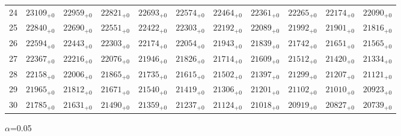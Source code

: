 \documentclass[10pt, a4paper]{article}
\begin{document}
\begin{center}
\begin{tabular}{c || c c c c c | c c c c c}
        24 & \({23109}_{+0}\) & \({22959}_{+0}\) & \({22821}_{+0}\) & \({22693}_{+0}\) & \({22574}_{+0}\) & \({22464}_{+0}\) & \({22361}_{+0}\) & \({22265}_{+0}\) & \({22174}_{+0}\) & \({22090}_{+0}\)\\
        25 & \({22840}_{+0}\) & \({22690}_{+0}\) & \({22551}_{+0}\) & \({22422}_{+0}\) & \({22303}_{+0}\) & \({22192}_{+0}\) & \({22089}_{+0}\) & \({21992}_{+0}\) & \({21901}_{+0}\) & \({21816}_{+0}\)\\
        \hline
        26 & \({22594}_{+0}\) & \({22443}_{+0}\) & \({22303}_{+0}\) & \({22174}_{+0}\) & \({22054}_{+0}\) & \({21943}_{+0}\) & \({21839}_{+0}\) & \({21742}_{+0}\) & \({21651}_{+0}\) & \({21565}_{+0}\)\\
        27 & \({22367}_{+0}\) & \({22216}_{+0}\) & \({22076}_{+0}\) & \({21946}_{+0}\) & \({21826}_{+0}\) & \({21714}_{+0}\) & \({21609}_{+0}\) & \({21512}_{+0}\) & \({21420}_{+0}\) & \({21334}_{+0}\)\\
        28 & \({22158}_{+0}\) & \({22006}_{+0}\) & \({21865}_{+0}\) & \({21735}_{+0}\) & \({21615}_{+0}\) & \({21502}_{+0}\) & \({21397}_{+0}\) & \({21299}_{+0}\) & \({21207}_{+0}\) & \({21121}_{+0}\)\\
        29 & \({21965}_{+0}\) & \({21812}_{+0}\) & \({21671}_{+0}\) & \({21540}_{+0}\) & \({21419}_{+0}\) & \({21306}_{+0}\) & \({21201}_{+0}\) & \({21102}_{+0}\) & \({21010}_{+0}\) & \({20923}_{+0}\)\\
        30 & \({21785}_{+0}\) & \({21631}_{+0}\) & \({21490}_{+0}\) & \({21359}_{+0}\) & \({21237}_{+0}\) & \({21124}_{+0}\) & \({21018}_{+0}\) & \({20919}_{+0}\) & \({20827}_{+0}\) & \({20739}_{+0}\)\\
        \hline
    \end{tabular}
    \pagebreak

    \(\alpha\)=0.05


\end{center}
\end{document}
